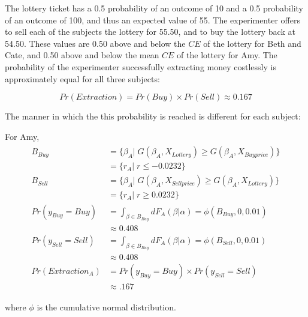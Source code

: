 \documentclass[11pt,a4paper]{report}
\newcommand\CE{\ensuremath{\mathit{CE}}}    %
\newcommand\Prob{\ensuremath{\mathit{Pr}}}  %
\begin{document}
The lottery ticket has a 0.5 probability of an outcome of 10 and a 0.5 probability of an outcome of 100, and thus an expected value of 55.
The experimenter offers to sell each of the subjects the lottery for 55.50, and to buy the lottery back at 54.50.
These values are 0.50 above and below the {\CE} of the lottery for Beth and Cate, and  0.50 above and below the mean {\CE} of the lottery for Amy.
The probability of the experimenter successfully extracting money costlessly is approximately equal for all three subjects:

\begin{equation}
	\label{eq2:pr.extraction}
	{\Prob}(\mathit{Extraction}) = {\Prob}(\mathit{Buy}) \times {\Prob}(\mathit{Sell}) \approx 0.167
\end{equation}

\noindent The manner in which the this probability is reached is different for each subject:

\noindent For Amy,
\begin{align}
	\label{eq2:Amy}
	\begin{split}
		B_{\mathit{Buy}} &= \{ \beta_A |\; G(\beta_A,X_{\mathit{Lottery}}) \geq G(\beta_A,X_{\mathit{Buy price}})\}\\
		&= \{ r_A \big|\; r \leq -0.0232 \} \\
		B_{\mathit{Sell}} &= \{ \beta_A |\; G(\beta_A,X_{\mathit{Sell price}}) \geq G(\beta_A,X_{\mathit{Lottery}})\}\\
		&= \{ r_A \big|\; r \geq 0.0232 \} \\[0.5ex]
		{\Prob}(y_{\mathit{Buy}}=\mathit{Buy}) &= \int_{\beta \in B_{\mathit{Buy}}} dF_A(\beta|\alpha) = \phi(B_{\mathit{Buy}},0,0.01)\\[0.5ex]
		&\approx 0.408 \\
		{\Prob}(y_{\mathit{Sell}}=\mathit{Sell}) &= \int_{\beta \in B_{\mathit{Buy}}} dF_A(\beta|\alpha) = \phi(B_{\mathit{Sell}},0,0.01)\\[0.5ex]
		&\approx 0.408 \\
		{\Prob}(\mathit{Extraction}_A) &= {\Prob}(y_{\mathit{Buy}} = \mathit{Buy}) \times {\Prob}(y_{\mathit{Sell}} = \mathit{Sell})\\
		&\approx .167
	\end{split}
\end{align}

\noindent where $\phi$ is the cumulative normal distribution.
\end{document}
